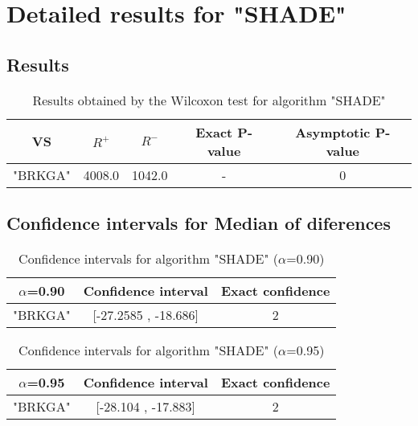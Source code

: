 \documentclass[a4paper,10pt]{article}
\begin{document}
 \clearpage 


\section{Detailed results for "SHADE"}


\subsection{Results}

\begin{table}[!htp]
\centering\small
\begin{tabular}{
|c|c|c|c|c|}
\hline
 VS & $R^{+}$ & $R^{-}$ & Exact P-value & Asymptotic P-value \\ \hline 
"BRKGA" & 4008.0 & 1042.0 & - & 0\\ \hline 

\end{tabular}
\caption{Results obtained by the Wilcoxon test for algorithm "SHADE"}
\end{table}

\subsection{Confidence intervals for Median of diferences}

\begin{table}[!htp]
\centering\small
\begin{tabular}{
|c|c|c|}
\hline
 $\alpha$=0.90 & Confidence interval & Exact confidence \\ \hline 
"BRKGA" & [-27.2585 , -18.686] & 2\\ \hline 

\end{tabular}
\caption{Confidence intervals for algorithm "SHADE" ($\alpha$=0.90)}
\end{table}
\begin{table}[!htp]
\centering\small
\begin{tabular}{
|c|c|c|}
\hline
 $\alpha$=0.95 & Confidence interval & Exact confidence \\ \hline 
"BRKGA" & [-28.104 , -17.883] & 2\\ \hline 

\end{tabular}
\caption{Confidence intervals for algorithm "SHADE" ($\alpha$=0.95)}
\end{table}

 \clearpage 
\end{document}
